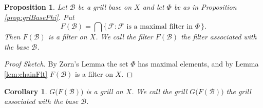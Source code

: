 \documentclass[12pt]{article}
\theoremstyle{plain}
\newtheorem{prop}[thm]{Proposition}
\newtheorem{cor}[thm]{Corollary}
\theoremstyle{definition}
\newcommand{\calB}{\mathcal{B}}
\newcommand{\calF}{\mathcal{F}}
\begin{document}
\begin{prop}
  Let $\calB$ be a grill base on $X$ and let $\Phi$ be as in Proposition \ref{prop:grlBasePhi}.
  Put 
  \[
    F(\calB) = \bigcap\{\, \calF : \mbox{$\calF$ is a maximal filter in $\Phi$} \,\}.
  \]
  Then $F(\calB)$ is a filter on $X$.
  We call the filter $F(\calB)$ the \textsl{filter associated with the base $\calB$}.
\end{prop}
\begin{proof}[Proof Sketch]
  By Zorn's Lemma the set $\Phi$ has maximal elements, and by Lemma \ref{lem:chainFlt} $F(\calB)$ is a filter on $X$.
\end{proof}

\begin{cor}
  $G\bigl(F(\calB)\bigr)$ is a grill on $X$.
  We call the grill $G\bigl(F(\calB)\bigr)$ the \textsl{grill associated with the base $\calB$}.
\end{cor}
\end{document}

